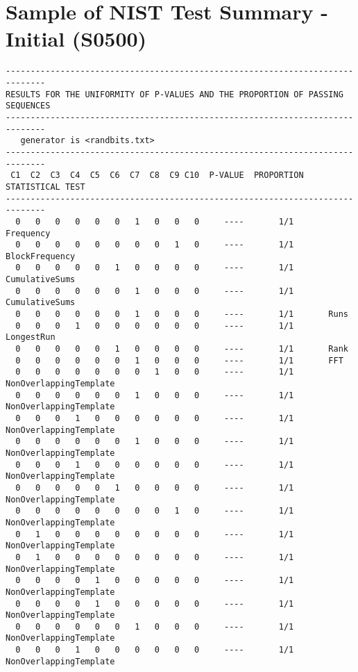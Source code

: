 \chapter{Sample of NIST Test Summary - Initial (S0500)}\label{adx:nist_summary_sample_init_0500}
\begin{code}
    \begin{verbatim}
------------------------------------------------------------------------------
RESULTS FOR THE UNIFORMITY OF P-VALUES AND THE PROPORTION OF PASSING SEQUENCES
------------------------------------------------------------------------------
   generator is <randbits.txt>
------------------------------------------------------------------------------
 C1  C2  C3  C4  C5  C6  C7  C8  C9 C10  P-VALUE  PROPORTION  STATISTICAL TEST
------------------------------------------------------------------------------
  0   0   0   0   0   0   1   0   0   0     ----       1/1       Frequency
  0   0   0   0   0   0   0   0   1   0     ----       1/1       BlockFrequency
  0   0   0   0   0   1   0   0   0   0     ----       1/1       CumulativeSums
  0   0   0   0   0   0   1   0   0   0     ----       1/1       CumulativeSums
  0   0   0   0   0   0   1   0   0   0     ----       1/1       Runs
  0   0   0   1   0   0   0   0   0   0     ----       1/1       LongestRun
  0   0   0   0   0   1   0   0   0   0     ----       1/1       Rank
  0   0   0   0   0   0   1   0   0   0     ----       1/1       FFT
  0   0   0   0   0   0   0   1   0   0     ----       1/1       NonOverlappingTemplate
  0   0   0   0   0   0   1   0   0   0     ----       1/1       NonOverlappingTemplate
  0   0   0   1   0   0   0   0   0   0     ----       1/1       NonOverlappingTemplate
  0   0   0   0   0   0   1   0   0   0     ----       1/1       NonOverlappingTemplate
  0   0   0   1   0   0   0   0   0   0     ----       1/1       NonOverlappingTemplate
  0   0   0   0   0   1   0   0   0   0     ----       1/1       NonOverlappingTemplate
  0   0   0   0   0   0   0   0   1   0     ----       1/1       NonOverlappingTemplate
  0   1   0   0   0   0   0   0   0   0     ----       1/1       NonOverlappingTemplate
  0   1   0   0   0   0   0   0   0   0     ----       1/1       NonOverlappingTemplate
  0   0   0   0   1   0   0   0   0   0     ----       1/1       NonOverlappingTemplate
  0   0   0   0   1   0   0   0   0   0     ----       1/1       NonOverlappingTemplate
  0   0   0   0   0   0   1   0   0   0     ----       1/1       NonOverlappingTemplate
  0   0   0   1   0   0   0   0   0   0     ----       1/1       NonOverlappingTemplate

\end{verbatim}
\end{code}
